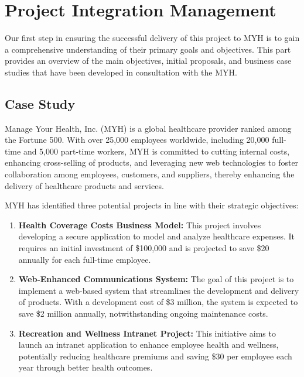 \chapter{Project Integration Management}

Our first step in ensuring the successful delivery of this project to MYH is to gain a comprehensive understanding of their primary goals and objectives. This part provides an overview of the main objectives, initial proposals, and business case studies that have been developed in consultation with the MYH.

\section{Case Study}

Manage Your Health, Inc. (MYH) is a global healthcare provider ranked among the Fortune 500. With over 25,000 employees worldwide, including 20,000 full-time and 5,000 part-time workers, MYH is committed to cutting internal costs, enhancing cross-selling of products, and leveraging new web technologies to foster collaboration among employees, customers, and suppliers, thereby enhancing the delivery of healthcare products and services.

MYH has identified three potential projects in line with their strategic objectives:

\begin{enumerate}[label=\textbf{\arabic*.}]
    \item \textbf{Health Coverage Costs Business Model:} This project involves developing a secure application to model and analyze healthcare expenses. It requires an initial investment of \$100,000 and is projected to save \$20 annually for each full-time employee.
    
    \item \textbf{Web-Enhanced Communications System:} The goal of this project is to implement a web-based system that streamlines the development and delivery of products. With a development cost of \$3 million, the system is expected to save \$2 million annually, notwithstanding ongoing maintenance costs.
    
    \item \textbf{Recreation and Wellness Intranet Project:} This initiative aims to launch an intranet application to enhance employee health and wellness, potentially reducing healthcare premiums and saving \$30 per employee each year through better health outcomes.
\end{enumerate}

